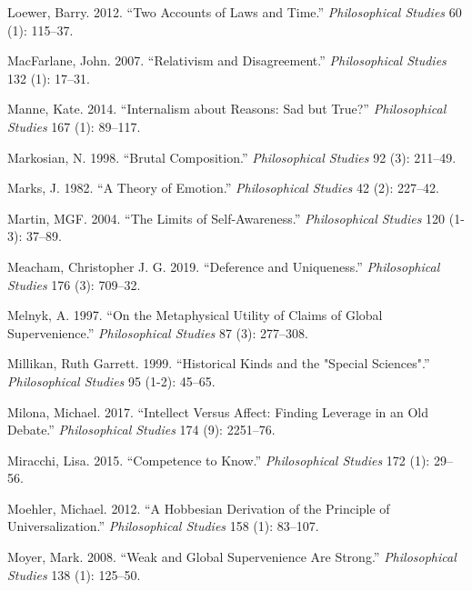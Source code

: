 \documentclass[
  10pt,
  letterpaper,
  DIV=11,
  numbers=noendperiod,
  twoside]{scrartcl}
\newlength{\cslhangindent}
\newenvironment{CSLReferences}[2] %
 {\begin{list}{}{%
  \setlength{\itemindent}{0pt}
  \setlength{\leftmargin}{0pt}
  \setlength{\parsep}{0pt}
  \ifodd #1
   \setlength{\leftmargin}{\cslhangindent}
   \setlength{\itemindent}{-1\cslhangindent}
  \fi
  \setlength{\itemsep}{#2\baselineskip}}}
 {\end{list}}
\begin{document}
\begin{CSLReferences}{1}{0}
Loewer, Barry. 2012. {``Two Accounts of Laws and Time.''}
\emph{Philosophical Studies} 60 (1): 115--37.

MacFarlane, John. 2007. {``Relativism and Disagreement.''}
\emph{Philosophical Studies} 132 (1): 17--31.

Manne, Kate. 2014. {``Internalism about Reasons: Sad but True?''}
\emph{Philosophical Studies} 167 (1): 89--117.

Markosian, N. 1998. {``Brutal Composition.''} \emph{Philosophical
Studies} 92 (3): 211--49.

Marks, J. 1982. {``A Theory of Emotion.''} \emph{Philosophical Studies}
42 (2): 227--42.

Martin, MGF. 2004. {``The Limits of Self-Awareness.''}
\emph{Philosophical Studies} 120 (1-3): 37--89.

Meacham, Christopher J. G. 2019. {``Deference and Uniqueness.''}
\emph{Philosophical Studies} 176 (3): 709--32.

Melnyk, A. 1997. {``On the Metaphysical Utility of Claims of Global
Supervenience.''} \emph{Philosophical Studies} 87 (3): 277--308.

Millikan, Ruth Garrett. 1999. {``Historical Kinds and the "Special
Sciences".''} \emph{Philosophical Studies} 95 (1-2): 45--65.

Milona, Michael. 2017. {``Intellect Versus Affect: Finding Leverage in
an Old Debate.''} \emph{Philosophical Studies} 174 (9): 2251--76.

Miracchi, Lisa. 2015. {``Competence to Know.''} \emph{Philosophical
Studies} 172 (1): 29--56.

Moehler, Michael. 2012. {``A Hobbesian Derivation of the Principle of
Universalization.''} \emph{Philosophical Studies} 158 (1): 83--107.

Moyer, Mark. 2008. {``Weak and Global Supervenience Are Strong.''}
\emph{Philosophical Studies} 138 (1): 125--50.


\end{CSLReferences}
\end{document}
